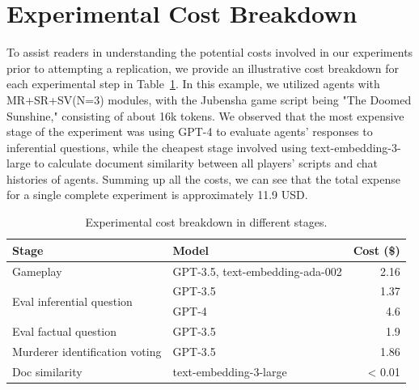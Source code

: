 \documentclass[11pt]{article}
\begin{document}
{\section{Experimental Cost Breakdown}
\label{sec:cost_breakdown}
To assist readers in understanding the potential costs involved in our experiments prior to attempting a replication, we provide an illustrative cost breakdown for each experimental step in Table~\ref{table:cost_breakdown}. In this example, we utilized agents with MR+SR+SV(N=3) modules, with the Jubensha game script being "The Doomed Sunshine," consisting of about 16k tokens. We observed that the most expensive stage of the experiment was using GPT-4 to evaluate agents’ responses to inferential questions, while the cheapest stage involved using text-embedding-3-large to calculate document similarity between all players' scripts and chat histories of agents. Summing up all the costs, we can see that the total expense for a single complete experiment is approximately 11.9 USD.

\begin{table}[thbp]
\centering

\label{tab:experiment_data}
\begin{tabular}{@{}llr@{}} %
\toprule
Stage & Model & Cost (\$) \\
\midrule
Gameplay & GPT-3.5, text-embedding-ada-002 & 2.16 \\
\multirow{2}{*}{Eval inferential question} & GPT-3.5 & 1.37 \\
 & GPT-4 & 4.6 \\
Eval factual question & GPT-3.5 & 1.9 \\
Murderer identification voting & GPT-3.5 & 1.86 \\
Doc similarity & text-embedding-3-large & < 0.01 \\
\bottomrule
\end{tabular}
\caption{Experimental cost breakdown in different stages.}
\label{table:cost_breakdown}
\end{table}

}
\end{document}
